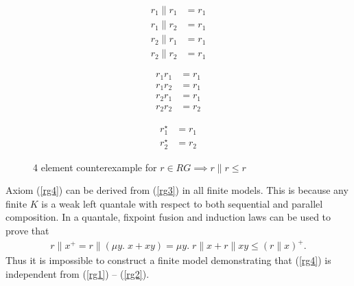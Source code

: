 \documentclass{llncs}
\begin{document}
\begin{figure}[H]
\centering
\begin{subfigure}{0.24\textwidth}
\end{subfigure}
\begin{subfigure}{0.24\textwidth}
\begin{align*}
r_1 \| r_1 &= r_1\\
r_1 \| r_2 &= r_1\\
r_2 \| r_1 &= r_1\\
r_2 \| r_2 &= r_1
\end{align*}
\end{subfigure}
\begin{subfigure}{0.24\textwidth}
\begin{align*}
r_1r_1 &= r_1\\
r_1r_2 &= r_1\\
r_2r_1 &= r_1\\
r_2r_2 &= r_2
\end{align*}
\end{subfigure}
\begin{subfigure}{0.24\textwidth}
\begin{align*}
r_1^\star &= r_1\\
r_2^\star &= r_2
\end{align*}
\end{subfigure}
\caption{4 element counterexample for $r \in RG \implies r\|r \le r$}
\label{fig:rg1}
\end{figure}

Axiom (\ref{rg4}) can be derived from (\ref{rg3}) in all finite
models. This is because any finite $K$ is a weak left quantale with
respect to both sequential and parallel composition. In a quantale,
fixpoint fusion and induction laws can be used to prove that
\begin{align*}
r\|x^+ = r\|(\mu y.\; x + xy) = \mu y.\; r\|x + r\|xy \le (r\|x)^+.
\end{align*}
Thus it is impossible to construct a finite model demonstrating
that (\ref{rg4}) is independent from (\ref{rg1}) -- (\ref{rg2}).
\end{document}
